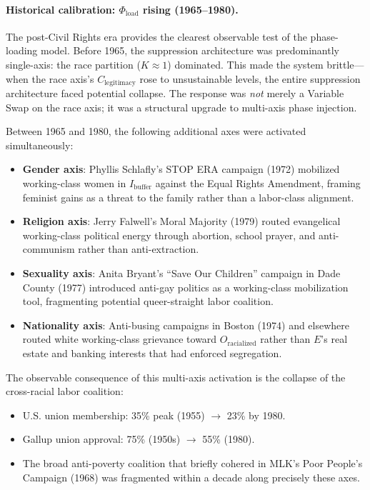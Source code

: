 \documentclass[12pt,openany]{book}
\begin{document}
\paragraph{Historical calibration: $\Phi_{\text{load}}$ rising (1965--1980).}
The post-Civil Rights era provides the clearest observable test of the phase-loading model. Before 1965, the suppression architecture was predominantly single-axis: the race partition ($K \approx 1$) dominated. This made the system brittle---when the race axis's $C_{\text{legitimacy}}$ rose to unsustainable levels, the entire suppression architecture faced potential collapse. The response was \textit{not} merely a Variable Swap on the race axis; it was a structural upgrade to multi-axis phase injection.

Between 1965 and 1980, the following additional axes were activated simultaneously:
\begin{itemize}[leftmargin=*, nosep]
    \item \textbf{Gender axis}: Phyllis Schlafly's STOP ERA campaign (1972) mobilized working-class women in $I_{\text{buffer}}$ against the Equal Rights Amendment, framing feminist gains as a threat to the family rather than a labor-class alignment.
    \item \textbf{Religion axis}: Jerry Falwell's Moral Majority (1979) routed evangelical working-class political energy through abortion, school prayer, and anti-communism rather than anti-extraction.
    \item \textbf{Sexuality axis}: Anita Bryant's ``Save Our Children'' campaign in Dade County (1977) introduced anti-gay politics as a working-class mobilization tool, fragmenting potential queer-straight labor coalition.
    \item \textbf{Nationality axis}: Anti-busing campaigns in Boston (1974) and elsewhere routed white working-class grievance toward $O_{\text{racialized}}$ rather than $E$'s real estate and banking interests that had enforced segregation.
\end{itemize}

The observable consequence of this multi-axis activation is the collapse of the cross-racial labor coalition:
\begin{itemize}[leftmargin=*, nosep]
    \item U.S. union membership: 35\% peak (1955) $\to$ 23\% by 1980.
    \item Gallup union approval: 75\% (1950s) $\to$ 55\% (1980).
    \item The broad anti-poverty coalition that briefly cohered in MLK's Poor People's Campaign (1968) was fragmented within a decade along precisely these axes.
\end{itemize}
\end{document}
